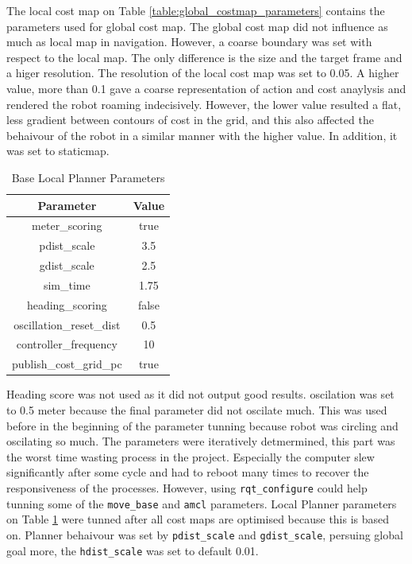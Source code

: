 \documentclass[10pt,journal,compsoc]{IEEEtran}
\begin{document}
The local cost map on Table \ref{table:global_costmap_parameters} contains the parameters used for global cost map. The global cost map did not influence as much as local map in navigation. However, a coarse boundary was set with respect to the local map. The only difference is the size and the target frame and a higer resolution. The resolution of the local cost map was set to 0.05. A higher value, more than 0.1 gave a coarse representation of action and cost anaylysis and rendered the robot roaming indecisively. However, the lower value resulted a flat, less gradient between contours of cost in the grid, and this also affected the behaivour of the robot in a similar manner with the higher value. 
In addition, it was set to staticmap.
\begin{table}[ht]
      \caption{Base Local Planner Parameters}
      \label{table:base_local_planner_parameters}
      \begin{center}
      \begin{tabular}{|c|c|}
      \hline
      Parameter & Value \\
      \hline\hline
      meter\_scoring & true \\
      \hline
      pdist\_scale & 3.5 \\
      \hline
      gdist\_scale & 2.5 \\
      \hline
      sim\_time & 1.75 \\
      \hline
      heading\_scoring & false \\
      \hline
      oscillation\_reset\_dist & 0.5 \\
      \hline
      controller\_frequency & 10 \\
      \hline
      publish\_cost\_grid\_pc & true \\
      \hline
      \end{tabular}
      \end{center}
\end{table}
Heading score was not used as it did not output good results. oscilation was set to 0.5 meter because the final parameter did not oscilate much. This was used before in the beginning of the parameter tunning because robot was circling and oscilating so much.
The parameters were iteratively detmermined, this part was the worst time wasting process in the project. Especially the computer slew significantly after some cycle and had to reboot many times to recover the responsiveness of the processes. However, using \verb!rqt_configure! could help tunning some of the \verb!move_base! and \verb!amcl! parameters.
Local Planner parameters on Table \ref{table:base_local_planner_parameters} were tunned after all cost maps are optimised because this is based on. Planner behaivour was set by \verb!pdist_scale! and \verb!gdist_scale!, persuing global goal more, the \verb!hdist_scale! was set to default 0.01.
\end{document}
